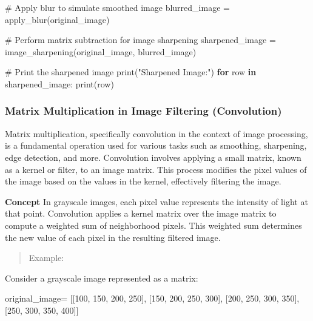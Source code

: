 \documentclass[
  letterpaper,
  DIV=11,
  numbers=noendperiod]{scrreprt}
\newenvironment{Shaded}{\begin{snugshade}}{\end{snugshade}}
\newcommand{\BuiltInTok}[1]{\textcolor[rgb]{0.00,0.23,0.31}{#1}}
\newcommand{\CommentTok}[1]{\textcolor[rgb]{0.37,0.37,0.37}{#1}}
\newcommand{\ControlFlowTok}[1]{\textcolor[rgb]{0.00,0.23,0.31}{\textbf{#1}}}
\newcommand{\DecValTok}[1]{\textcolor[rgb]{0.68,0.00,0.00}{#1}}
\newcommand{\KeywordTok}[1]{\textcolor[rgb]{0.00,0.23,0.31}{\textbf{#1}}}
\newcommand{\NormalTok}[1]{\textcolor[rgb]{0.00,0.23,0.31}{#1}}
\newcommand{\OperatorTok}[1]{\textcolor[rgb]{0.37,0.37,0.37}{#1}}
\newcommand{\StringTok}[1]{\textcolor[rgb]{0.13,0.47,0.30}{#1}}
\theoremstyle{plain}
\theoremstyle{definition}
\theoremstyle{remark}
\begin{document}
\begin{Shaded}
\begin{Highlighting}[]
\CommentTok{\# Apply blur to simulate smoothed image}
\NormalTok{blurred\_image }\OperatorTok{=}\NormalTok{ apply\_blur(original\_image)}

\CommentTok{\# Perform matrix subtraction for image sharpening}
\NormalTok{sharpened\_image }\OperatorTok{=}\NormalTok{ image\_sharpening(original\_image, blurred\_image)}

\CommentTok{\# Print the sharpened image}
\BuiltInTok{print}\NormalTok{(}\StringTok{"Sharpened Image:"}\NormalTok{)}
\ControlFlowTok{for}\NormalTok{ row }\KeywordTok{in}\NormalTok{ sharpened\_image:}
    \BuiltInTok{print}\NormalTok{(row)}
\end{Highlighting}
\end{Shaded}

\subsubsection{Matrix Multiplication in Image Filtering
(Convolution)}\label{matrix-multiplication-in-image-filtering-convolution}

Matrix multiplication, specifically convolution in the context of image
processing, is a fundamental operation used for various tasks such as
smoothing, sharpening, edge detection, and more. Convolution involves
applying a small matrix, known as a kernel or filter, to an image
matrix. This process modifies the pixel values of the image based on the
values in the kernel, effectively filtering the image.

\textbf{Concept} In grayscale images, each pixel value represents the
intensity of light at that point. Convolution applies a kernel matrix
over the image matrix to compute a weighted sum of neighborhood pixels.
This weighted sum determines the new value of each pixel in the
resulting filtered image.

\begin{quote}
Example:
\end{quote}

Consider a grayscale image represented as a matrix:

\begin{Shaded}
\begin{Highlighting}[]
\NormalTok{original\_image}\OperatorTok{=}\NormalTok{ [[}\DecValTok{100}\NormalTok{, }\DecValTok{150}\NormalTok{, }\DecValTok{200}\NormalTok{, }\DecValTok{250}\NormalTok{],}
\NormalTok{ [}\DecValTok{150}\NormalTok{, }\DecValTok{200}\NormalTok{, }\DecValTok{250}\NormalTok{, }\DecValTok{300}\NormalTok{],}
\NormalTok{ [}\DecValTok{200}\NormalTok{, }\DecValTok{250}\NormalTok{, }\DecValTok{300}\NormalTok{, }\DecValTok{350}\NormalTok{],}
\NormalTok{ [}\DecValTok{250}\NormalTok{, }\DecValTok{300}\NormalTok{, }\DecValTok{350}\NormalTok{, }\DecValTok{400}\NormalTok{]]}
\end{Highlighting}
\end{Shaded}
\end{document}
